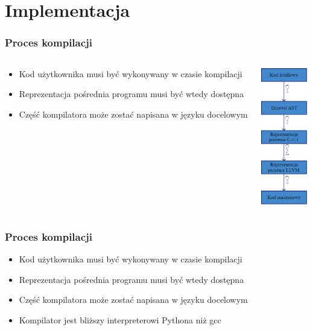 \section{Implementacja}

\begin{frame}
	\frametitle{Proces kompilacji}

	\begin{columns}
		\begin{column}{0.5\textwidth}
			\begin{itemize}
				\item Kod użytkownika musi być wykonywany w czasie kompilacji
				\item Reprezentacja pośrednia programu musi być wtedy dostępna
				\item Część kompilatora może zostać napisana w języku docelowym
			\end{itemize}
		\end{column}
		\begin{column}{0.5\textwidth}  %
			\begin{center}
			 \includegraphics[height=6cm]{../assets/toplevelcompilationprocess.png}
			 \end{center}
		\end{column}
	\end{columns}
\end{frame}

\begin{frame}
	\frametitle{Proces kompilacji}

	\begin{itemize}
		\item Kod użytkownika musi być wykonywany w czasie kompilacji
		\item Reprezentacja pośrednia programu musi być wtedy dostępna
		\item Część kompilatora może zostać napisana w języku docelowym
		\item Kompilator jest bliższy interpreterowi Pythona niż gcc
	\end{itemize}

\end{frame}

